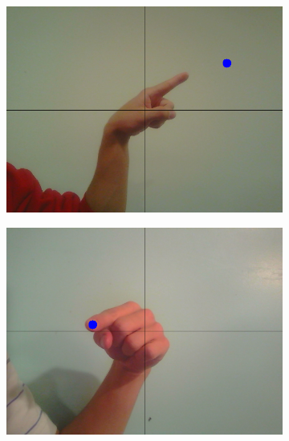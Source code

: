 \documentclass[10pt,twocolumn,letterpaper]{article}
\begin{document}
\begin{figure}[t]
	\begin{center}
		\begin{subfigure}[b]{0.45\linewidth}
			\includegraphics[width=\linewidth]{figures/PointImage.png}
			\caption{} %
			\label{fig:pointImage}
		\end{subfigure}
		\begin{subfigure}[b]{0.45\linewidth}
			\includegraphics[width=\linewidth]{figures/PointLeft2Image.png}
			\caption{}
			\label{fig:pointLeft2Image}
		\end{subfigure}
		\begin{subfigure}[b]{0.45\linewidth}

\end{subfigure}
\end{center}
\end{figure}
\end{document}
